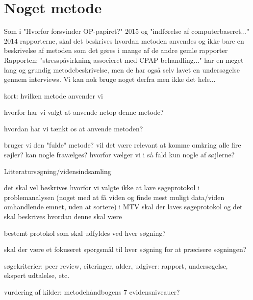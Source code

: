 \section{Noget metode}

Som i "Hvorfor forsvinder OP-papiret?" 2015 og "indførelse af computerbaseret..." 2014 rapporterne, skal det beskrives hvordan metoden anvendes og ikke bare en beskrivelse af metoden som det gøres i mange af de andre gemle rapporter
Rapporten: "stresspåvirkning associeret med CPAP-behandling..." har en meget lang og grundig metodebeskrivelse, men de har også selv lavet en undersøgelse gennem interviews. Vi kan nok bruge noget derfra men ikke det hele...

\item kort: hvilken metode anvender vi
\item hvorfor har vi valgt at anvende netop denne metode?
\item hvordan har vi tænkt os at anvende metoden?
\item bruger vi den "fulde" metode? vil det være relevant at komme omkring alle fire søjler? kan nogle fravælges? hvorfor vælger vi i så fald kun nogle af søjlerne? 


Litteratursøgning/vidensindsamling

det skal vel beskrives hvorfor vi valgte ikke at lave søgeprotokol i problemanalysen (noget med at få viden og finde mest muligt data/viden omhandlende emnet, uden at sortere) 
i MTV skal der laves søgeprotokol og det skal beskrives hvordan denne skal være
\item bestemt protokol som skal udfyldes ved hver søgning?
\item skal der være et fokuseret spørgsmål til hver søgning for at præcisere søgningen?
\item søgekriterier: peer review, citeringer, alder, udgiver: rapport, undersøgelse, ekspert udtalelse, etc. 
\item vurdering af kilder: metodehåndbogens 7 evidensniveauer?
